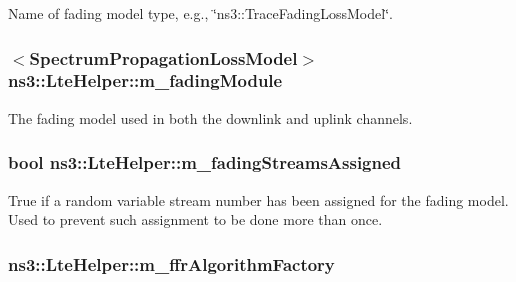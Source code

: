 Name of fading model type, e.\+g., \char`\"{}ns3\+::\+Trace\+Fading\+Loss\+Model\char`\"{}. 

\subsubsection[{\texorpdfstring{m\+\_\+fading\+Module}{m_fadingModule}}]{$<${\bf Spectrum\+Propagation\+Loss\+Model}$>$ ns3\+::\+Lte\+Helper\+::m\+\_\+fading\+Module\hspace{0.3cm}{\ttfamily [private]}}\hypertarget{classns3_1_1LteHelper_ab986df63e68ba63cb4d2c95bdbf9f47a}{}\label{classns3_1_1LteHelper_ab986df63e68ba63cb4d2c95bdbf9f47a}


The fading model used in both the downlink and uplink channels. 

\subsubsection[{\texorpdfstring{m\+\_\+fading\+Streams\+Assigned}{m_fadingStreamsAssigned}}]{\setlength{\rightskip}{0pt plus 5cm}bool ns3\+::\+Lte\+Helper\+::m\+\_\+fading\+Streams\+Assigned\hspace{0.3cm}{\ttfamily [private]}}\hypertarget{classns3_1_1LteHelper_a88e2bb1e3428772135954bf05c17c34e}{}\label{classns3_1_1LteHelper_a88e2bb1e3428772135954bf05c17c34e}
True if a random variable stream number has been assigned for the fading model. Used to prevent such assignment to be done more than once. 
\subsubsection[{\texorpdfstring{m\+\_\+ffr\+Algorithm\+Factory}{m_ffrAlgorithmFactory}}]{ ns3\+::\+Lte\+Helper\+::m\+\_\+ffr\+Algorithm\+Factory\hspace{0.3cm}{\ttfamily [private]}}\hypertarget{classns3_1_1LteHelper_a26739b9eded6b728e7fe5077db758764}{}\label{classns3_1_1LteHelper_a26739b9eded6b728e7fe5077db758764}



